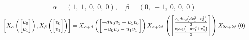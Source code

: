 \documentclass[11pt]{article}
\theoremstyle{definition}
\begin{document}
\[
\alpha = \left( 1, \  1, \  0, \  0, \  0\right), \quad \beta = \left( 0, \  -1, \  0, \  0, \  0\right)
\]
\[
\scaletoalign{\textwidth}{\left[ X_{\alpha}\left(\left[\begin{matrix}u_{0}\\u_{1}\end{matrix}\right]\right), X_{\beta}\left(\left[\begin{matrix}v_{0}\\v_{1}\end{matrix}\right]\right) \right] = X_{\alpha + \beta}\left(\left[\begin{matrix}- d u_{0} v_{1} - u_{1} v_{0}\\- u_{0} v_{0} - u_{1} v_{1}\end{matrix}\right]\right) X_{\alpha + 2\beta}\left(\left[\begin{matrix}\frac{c_{0} d u_{0} \left(d v_{1}^{2} - v_{0}^{2}\right)}{2}\\\frac{c_{0} u_{1} \left(- d v_{1}^{2} + v_{0}^{2}\right)}{2}\end{matrix}\right]\right) X_{2\alpha + 2\beta}\left(0\right)}
\]
\end{document}
